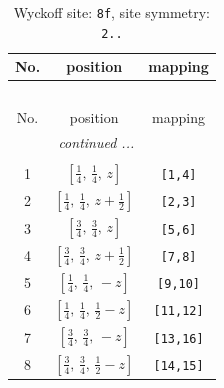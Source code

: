 \documentclass[fleqn,8pt]{jsarticle}
\begin{document}
\begin{longtable}{ccc}
\caption{Wyckoff site: {\tt 8f}, site symmetry: {\tt 2..}}
 \\
 \hline \hline
No. & position & mapping \\ \hline \endfirsthead

\multicolumn{2}{l}{\tablename\ \thetable{}} \\
 \hline \hline
No. & position & mapping \\ \hline \endhead

 \hline \hline
\multicolumn{2}{r}{\footnotesize\it continued ...} \\ \endfoot

 \hline \hline
\multicolumn{2}{r}{} \\ \endlastfoot

1 & $\left[ \frac{1}{4},\, \frac{1}{4},\, z \right]$ & {\tt [1,4]} \\ \hline
2 & $\left[ \frac{1}{4},\, \frac{1}{4},\, z + \frac{1}{2} \right]$ & {\tt [2,3]} \\ \hline
3 & $\left[ \frac{3}{4},\, \frac{3}{4},\, z \right]$ & {\tt [5,6]} \\ \hline
4 & $\left[ \frac{3}{4},\, \frac{3}{4},\, z + \frac{1}{2} \right]$ & {\tt [7,8]} \\ \hline
5 & $\left[ \frac{1}{4},\, \frac{1}{4},\, - z \right]$ & {\tt [9,10]} \\ \hline
6 & $\left[ \frac{1}{4},\, \frac{1}{4},\, \frac{1}{2} - z \right]$ & {\tt [11,12]} \\ \hline
7 & $\left[ \frac{3}{4},\, \frac{3}{4},\, - z \right]$ & {\tt [13,16]} \\ \hline
8 & $\left[ \frac{3}{4},\, \frac{3}{4},\, \frac{1}{2} - z \right]$ & {\tt [14,15]} \\
\end{longtable}
\renewcommand{\arraystretch}{1.2}
\end{document}

